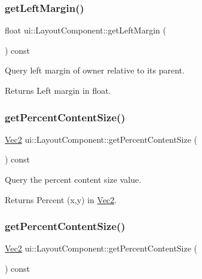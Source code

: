 \subsubsection{\texorpdfstring{get\+Left\+Margin()}{getLeftMargin()}\hspace{0.1cm}{\footnotesize\ttfamily [2/2]}}
{\footnotesize\ttfamily float ui\+::\+Layout\+Component\+::get\+Left\+Margin (\begin{DoxyParamCaption}{ }\end{DoxyParamCaption}) const}

Query left margin of owner relative to its parent. \begin{DoxyReturn}{Returns}
Left margin in float. 
\end{DoxyReturn}
\mbox{\label{classui_1_1LayoutComponent_a504d9311e533c902d44aa415f9027a4f}} 
\subsubsection{\texorpdfstring{get\+Percent\+Content\+Size()}{getPercentContentSize()}\hspace{0.1cm}{\footnotesize\ttfamily [1/2]}}
{\footnotesize\ttfamily \hyperlink{classVec2}{Vec2} ui\+::\+Layout\+Component\+::get\+Percent\+Content\+Size (\begin{DoxyParamCaption}{ }\end{DoxyParamCaption}) const}

Query the percent content size value. \begin{DoxyReturn}{Returns}
Percent (x,y) in \hyperlink{classVec2}{Vec2}. 
\end{DoxyReturn}
\mbox{\label{classui_1_1LayoutComponent_a504d9311e533c902d44aa415f9027a4f}} 
\subsubsection{\texorpdfstring{get\+Percent\+Content\+Size()}{getPercentContentSize()}\hspace{0.1cm}{\footnotesize\ttfamily [2/2]}}
{\footnotesize\ttfamily \hyperlink{classVec2}{Vec2} ui\+::\+Layout\+Component\+::get\+Percent\+Content\+Size (\begin{DoxyParamCaption}{ }\end{DoxyParamCaption}) const}

